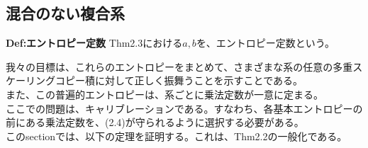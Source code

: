 \documentclass[a4paper,11pt]{jsarticle}
\numberwithin{equation}{section}
\begin{document}
\subsection{混合のない複合系}
\begin{itembox}[l]{\textbf{Def:エントロピー定数}}
    Thm2.3における$a,b$を、エントロピー定数という。
\end{itembox}
我々の目標は、これらのエントロピーをまとめて、さまざまな系の任意の多重スケーリングコピー積に対して正しく振舞うことを示すことである。\\
また、この普遍的エントロピーは、系ごとに乗法定数が一意に定まる。\\
ここでの問題は、キャリブレーションである。すなわち、各基本エントロピーの前にある乗法定数を、(2.4)が守られるように選択する必要がある。\\
このsectionでは、以下の定理を証明する。これは、Thm2.2の一般化である。\\
\end{document}
